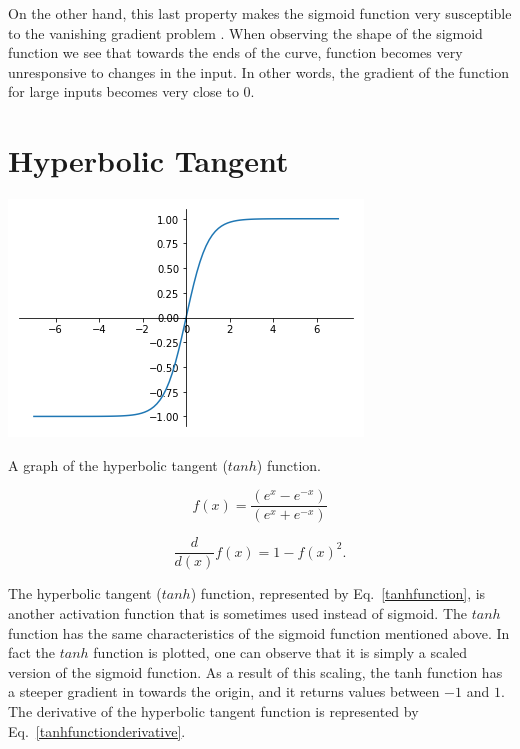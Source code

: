 On the other hand, this last property makes the sigmoid function very susceptible to the vanishing gradient problem \citep{bengio94}. When observing the shape of the sigmoid function we see that towards the ends of the curve, function becomes very unresponsive to changes in the input. In other words, the gradient of the function for large inputs becomes very close to $0$. 

\section{Hyperbolic Tangent}\label{sec:tanh}
\begin{marginfigure}
  \includegraphics{graphics/activation_functions/tanh_function.png}
  \label{fig:tanhfunction}
  \caption{
    A graph of the hyperbolic tangent ($tanh$) function.
  }
\end{marginfigure}

\begin{equation}\label{tanhfunction}
    f(x) = \frac{(e^{x} - e^{-x})}{(e^{x} + e^{-x})}
\end{equation}

\begin{equation}\label{tanhfunctionderivative}
    \frac{d}{d(x)}f(x) = 1-f(x)^2.
\end{equation}

The hyperbolic tangent ($tanh$) function, represented by  Eq.~\ref{tanhfunction}, is another activation function that is sometimes used instead of sigmoid. The $tanh$ function has the same characteristics of the sigmoid function mentioned above. In fact the $tanh$ function is plotted, one can observe that it is simply a scaled version of the sigmoid function. As a result of this scaling, the tanh function has a steeper gradient in towards the origin, and it returns values between $-1$ and $1$. The derivative of the hyperbolic tangent function is represented by Eq.~\ref{tanhfunctionderivative}.

